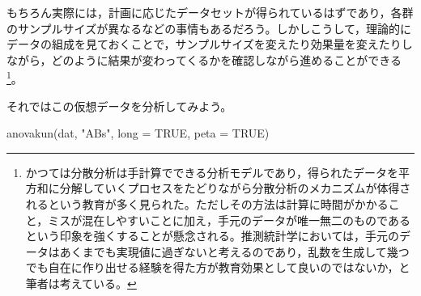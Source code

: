 \documentclass[
  a4paper,
]{ltjsbook}
\newenvironment{Shaded}{\begin{snugshade}}{\end{snugshade}}
\newcommand{\AttributeTok}[1]{\textcolor[rgb]{0.40,0.45,0.13}{#1}}
\newcommand{\ConstantTok}[1]{\textcolor[rgb]{0.56,0.35,0.01}{#1}}
\newcommand{\FunctionTok}[1]{\textcolor[rgb]{0.28,0.35,0.67}{#1}}
\newcommand{\NormalTok}[1]{\textcolor[rgb]{0.00,0.23,0.31}{#1}}
\newcommand{\StringTok}[1]{\textcolor[rgb]{0.13,0.47,0.30}{#1}}
\begin{document}
もちろん実際には，計画に応じたデータセットが得られているはずであり，各群のサンプルサイズが異なるなどの事情もあるだろう。しかしこうして，理論的にデータの組成を見ておくことで，サンプルサイズを変えたり効果量を変えたりしながら，どのように結果が変わってくるかを確認しながら進めることができる\footnote{かつては分散分析は手計算でできる分析モデルであり，得られたデータを平方和に分解していくプロセスをたどりながら分散分析のメカニズムが体得されるという教育が多く見られた。ただしその方法は計算に時間がかかること，ミスが混在しやすいことに加え，手元のデータが唯一無二のものであるという印象を強くすることが懸念される。推測統計学においては，手元のデータはあくまでも実現値に過ぎないと考えるのであり，乱数を生成して幾つでも自在に作り出せる経験を得た方が教育効果として良いのではないか，と筆者は考えている。}。

それではこの仮想データを分析してみよう。

\begin{Shaded}
\begin{Highlighting}[]
\FunctionTok{anovakun}\NormalTok{(dat, }\StringTok{"ABs"}\NormalTok{, }\AttributeTok{long =} \ConstantTok{TRUE}\NormalTok{, }\AttributeTok{peta =} \ConstantTok{TRUE}\NormalTok{)}
\end{Highlighting}
\end{Shaded}
\end{document}
